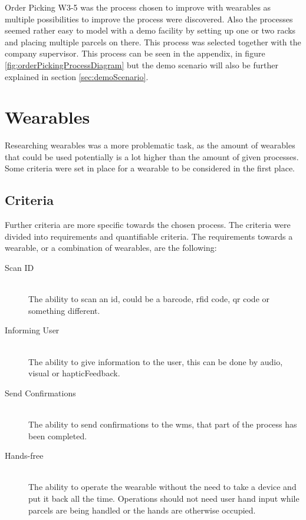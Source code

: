 Order Picking W3-5 was the process chosen to improve with wearables as multiple possibilities to improve the process were discovered. Also the processes seemed rather easy to model with a demo facility by setting up one or two racks and placing multiple \gls{parcel}s on there. This process was selected together with the company supervisor. This process can be seen in the appendix, in figure \ref{fig:orderPickingProcessDiagram} but the demo scenario will also be further explained in section \ref{sec:demoScenario}.

\section{Wearables}\label{sec:wearables}
Researching wearables was a more problematic task, as the amount of wearables that could be used potentially is a lot higher than the amount of given processes. Some criteria were set in place for a wearable to be considered in the first place.

\subsection{Criteria}

Further criteria are more specific towards the chosen process. The criteria were divided into requirements and quantifiable criteria. The requirements towards a wearable, or a combination of wearables, are the following:
\begin{description}
	\item[Scan ID] \hfill \\
		The ability to scan an \gls{id}, could be a barcode, \gls{rfid} code, \gls{qr} code or something different.
	\item[Informing User] \hfill \\
		The ability to give information to the user, this can be done by audio, visual or \gls{hapticFeedback}. 
	\item[Send Confirmations] \hfill \\
		The ability to send confirmations to the \gls{wms}, that part of the process has been completed.
	\item[Hands-free] \hfill \\
		The ability to operate the wearable without the need to take a device and put it back all the time. Operations should not need user hand input while \gls{parcel}s are being handled or the hands are otherwise occupied.
\end{description}

